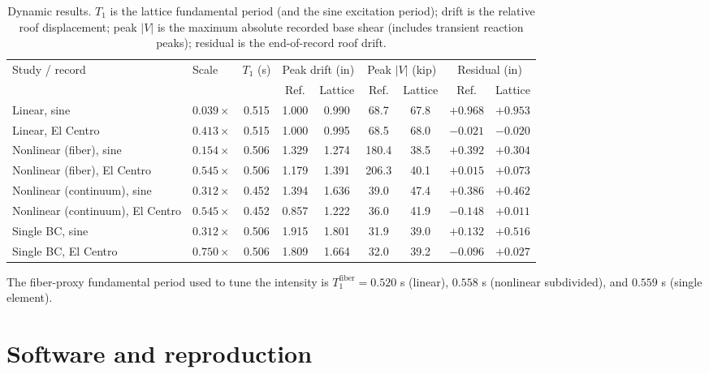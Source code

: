 \documentclass[11pt]{article}
\begin{document}
\begin{table}[H]
\centering
\caption{Dynamic results. $T_1$ is the lattice fundamental period (and the sine excitation period);
drift is the relative roof displacement; peak $|V|$ is the maximum absolute recorded base shear
(includes transient reaction peaks); residual is the end-of-record roof drift.}
\small
\setlength{\tabcolsep}{4pt}
\begin{tabular}{l l c c c c c c c}
\toprule
\multirow{2}{*}{Study / record} & \multirow{2}{*}{Scale} & \multirow{2}{*}{$T_1$ (s)}
 & \multicolumn{2}{c}{Peak drift (in)} & \multicolumn{2}{c}{Peak $|V|$ (kip)} & \multicolumn{2}{c}{Residual (in)} \\
\cmidrule(lr){4-5}\cmidrule(lr){6-7}\cmidrule(lr){8-9}
 & & & Ref. & Lattice & Ref. & Lattice & Ref. & Lattice \\
\midrule
Linear, sine            & $0.039\times$ & 0.515 & 1.000 & 0.990 & 68.7 & 67.8 & $+0.968$ & $+0.953$ \\
Linear, El Centro       & $0.413\times$ & 0.515 & 1.000 & 0.995 & 68.5 & 68.0 & $-0.021$ & $-0.020$ \\
\midrule
Nonlinear (fiber), sine      & $0.154\times$ & 0.506 & 1.329 & 1.274 & 180.4 & 38.5 & $+0.392$ & $+0.304$ \\
Nonlinear (fiber), El Centro & $0.545\times$ & 0.506 & 1.179 & 1.391 & 206.3 & 40.1 & $+0.015$ & $+0.073$ \\
\midrule
Nonlinear (continuum), sine      & $0.312\times$ & 0.452 & 1.394 & 1.636 & 39.0 & 47.4 & $+0.386$ & $+0.462$ \\
Nonlinear (continuum), El Centro & $0.545\times$ & 0.452 & 0.857 & 1.222 & 36.0 & 41.9 & $-0.148$ & $+0.011$ \\
\midrule
Single BC, sine         & $0.312\times$ & 0.506 & 1.915 & 1.801 & 31.9 & 39.0 & $+0.132$ & $+0.516$ \\
Single BC, El Centro    & $0.750\times$ & 0.506 & 1.809 & 1.664 & 32.0 & 39.2 & $-0.096$ & $+0.027$ \\
\bottomrule
\end{tabular}
\end{table}

The fiber-proxy fundamental period used to tune the intensity is $T_1^{\mathrm{fiber}}=0.520$ s
(linear), $0.558$ s (nonlinear subdivided), and $0.559$ s (single element).

\appendix
\section{Software and reproduction}
\end{document}
